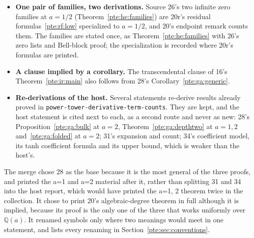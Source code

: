 \documentclass[11pt,a4paper]{article}
\numberwithin{equation}{section}
\theoremstyle{definition}
\theoremstyle{plain}
\begin{document}
\begin{itemize}
\item \textbf{One pair of families, two derivations.} Source 26's two infinite zero families at $a=1/2$ (Theorem~\ref{pte:he:families}) are 20r's residual formulas~\eqref{pte:rf:low} specialized to $a=1/2$, and 20's endpoint remark counts them. The families are stated once, as Theorem~\ref{pte:he:families} with 26's zero lists and Bell-block proof; the specialization is recorded where 20r's formulas are printed.
\item \textbf{A clause implied by a corollary.} The transcendental clause of 16's Theorem~\ref{pte:ir:main} also follows from 28's Corollary~\ref{pte:ga:generic}.
\item \textbf{Re-derivations of the host.} Several statements re-derive results already proved in \texttt{power-\allowbreak{}tower-\allowbreak{}derivative-\allowbreak{}term-\allowbreak{}counts}. They are kept, and the host statement is cited next to each, as a second route and never as new: 28's Proposition~\ref{pte:ga:bulk} at $a=2$, Theorem~\ref{pte:ga:depthtwo} at $a=1,2$ and~\eqref{pte:ga:folded} at $a=2$; 31's expansion and count; 34's coefficient model, its tanh coefficient formula and its upper bound, which is weaker than the host's.
\end{itemize}
The merge chose 28 as the base because it is the most general of the three proofs, and printed the a=1 and a=2 material after it, rather than splitting 31 and 34 into the host report, which would have printed the a=1, 2 theorem twice in the collection. It chose to print 20's algebraic-degree theorem in full although it is implied, because its proof is the only one of the three that works uniformly over $\mathbb Q(a)$. It renamed symbols only where two meanings would meet in one statement, and lists every renaming in Section~\ref{pte:sec:conventions}.
\end{document}
